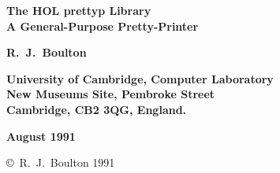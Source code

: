 
\begin{titlepage}

\setcounter{page}{1}		          %


\mbox{}
\vskip20mm
\begin{center}
{\Huge\bf The HOL prettyp Library}\\
\medskip
{\Large\bf A General-Purpose Pretty-Printer}
\end{center}


\vskip15mm
\begin{center}
\large\bf R.\ J.\ Boulton
\end{center}


\vfill
\begin{center}
\bf
University of Cambridge, Computer Laboratory\\
New Museums Site, Pembroke Street\\
Cambridge, {\small\bf CB}2 3{\small\bf QG}, England.
\end{center}


\vskip5mm
\begin{center}
\bf August 1991
\end{center}

\end{titlepage}

\thispagestyle{empty}
\mbox{}

\vfill
\begin{center}
\copyright\ R.\ J.\ Boulton 1991 
\end{center}
\newpage

